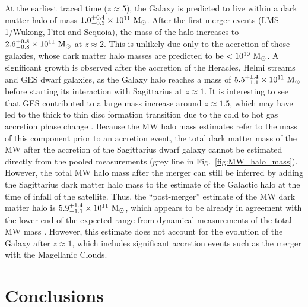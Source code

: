 At the earliest traced time ($z\approx5$), the Galaxy is predicted to live within a dark matter halo of mass $1.0^{+0.4}_{-0.3} \times 10^{11}~\rm{M_{\ensuremath{\odot}}}$.  After the first merger events (LMS-1/Wukong, I'itoi and Sequoia), the mass of the halo increases to $2.6^{+0.8}_{-0.8} \times 10^{11}~\rm{M_{\ensuremath{\odot}}}$ at $z\approx2$. This is unlikely due only to the accretion of those galaxies, whose dark matter halo masses are predicted to be $<10^{10}~\rm{M}_{\odot}$. A significant growth is observed after the accretion of the Heracles, Helmi streams and GES dwarf galaxies, as the Galaxy halo reaches a mass of $5.5^{+1.4}_{-1.1} \times 10^{11}~\rm{M_{\ensuremath{\odot}}}$ before starting its interaction with Sagittarius at $z\approx1$. It is interesting to see that GES contributed to a large mass increase around $z\approx1.5$, which may have led to the thick to thin disc formation transition due to the cold to hot gas accretion phase change \citep{Grand2018,Funakoshi2025}. 
Because the MW halo mass estimates refer to the mass of this component prior to an accretion event, the total dark matter mass of the MW after the accretion of the Sagittarius dwarf galaxy cannot be estimated directly from the pooled measurements (grey line in Fig.~\ref{fig:MW_halo_mass}).  However,  the total MW halo mass after the merger can still be inferred by adding the Sagittarius dark matter halo mass to the estimate of the Galactic halo at the time of infall of the satellite. Thus, the ``post-merger'' estimate of the MW dark matter halo is $5.9^{+1.4}_{-1.1} \times 10^{11}~\rm{M_{\ensuremath{\odot}}}$, which appears to be already in agreement with the lower end of the expected range from dynamical measurements of the total MW mass \citep[e.g.,][]{Wang2022}. However, this estimate does not account for the evolution of the Galaxy after $z\approx1$, which includes significant accretion events such as the merger with the Magellanic Clouds.




\section{Conclusions}
\label{sec:conclusions}

